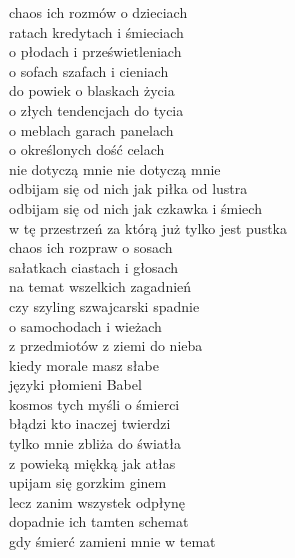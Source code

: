 \begin{text}
    chaos ich rozmów o dzieciach\\
    ratach kredytach i śmieciach\\
    o płodach i prześwietleniach\\
    o sofach szafach i cieniach\\
    do powiek o blaskach życia\\
    o złych tendencjach do tycia\\
    o meblach garach panelach\\
    o określonych dość celach\\
    nie dotyczą mnie nie dotyczą mnie\\
    odbijam się od nich jak piłka od lustra\\
    odbijam się od nich jak czkawka i śmiech\\
    w tę przestrzeń za którą już tylko jest pustka\\
    chaos ich rozpraw o sosach\\
    sałatkach ciastach i głosach\\
    na temat wszelkich zagadnień\\
    czy szyling szwajcarski spadnie\\
    o samochodach i wieżach\\
    z przedmiotów z ziemi do nieba\\
    kiedy morale masz słabe\\
    języki płomieni Babel\\
    kosmos tych myśli o śmierci\\
    błądzi kto inaczej twierdzi\\
    tylko mnie zbliża do światła\\
    z powieką miękką jak atłas\\
    upijam się gorzkim ginem\\
    lecz zanim wszystek odpłynę\\
    dopadnie ich tamten schemat\\
    gdy śmierć zamieni mnie w temat
\end{text}
\begin{chord}

\end{chord}